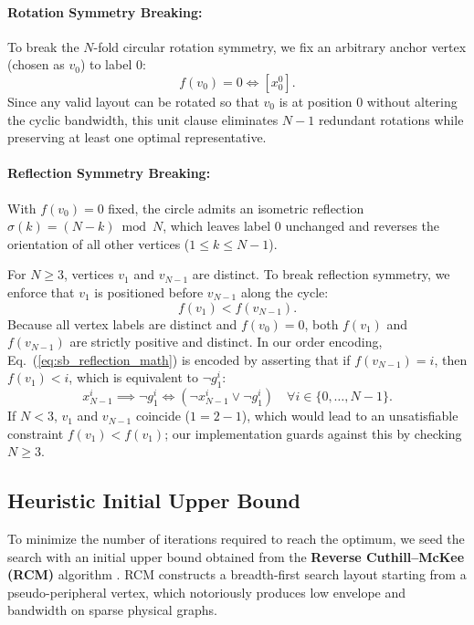 \documentclass[a4paper,fleqn]{cas-sc}
\begin{document}
\paragraph{Rotation Symmetry Breaking:}
To break the $N$-fold circular rotation symmetry, we fix an arbitrary anchor vertex (chosen as $v_0$) to label 0:
\begin{equation}
    f(v_0) = 0 \iff [x_0^0].
    \label{eq:sb_rotation}
\end{equation}
Since any valid layout can be rotated so that $v_0$ is at position 0 without altering the cyclic bandwidth, this unit clause eliminates $N - 1$ redundant rotations while preserving at least one optimal representative.

\paragraph{Reflection Symmetry Breaking:}
With $f(v_0) = 0$ fixed, the circle admits an isometric reflection $\sigma(k) = (N - k) \bmod N$, which leaves label 0 unchanged and reverses the orientation of all other vertices ($1 \le k \le N-1$).

For $N \ge 3$, vertices $v_1$ and $v_{N-1}$ are distinct. To break reflection symmetry, we enforce that $v_1$ is positioned before $v_{N-1}$ along the cycle:
\begin{equation}
    f(v_1) < f(v_{N-1}).
    \label{eq:sb_reflection_math}
\end{equation}
Because all vertex labels are distinct and $f(v_0) = 0$, both $f(v_1)$ and $f(v_{N-1})$ are strictly positive and distinct. In our order encoding, Eq.~(\ref{eq:sb_reflection_math}) is encoded by asserting that if $f(v_{N-1}) = i$, then $f(v_1) < i$, which is equivalent to $\neg g_1^i$:
\begin{equation}
    x_{N-1}^i \implies \neg g_1^i \iff (\neg x_{N-1}^i \lor \neg g_1^i) \quad \forall i \in \{0, \dots, N-1\}.
    \label{eq:sb_reflection_clauses}
\end{equation}
If $N < 3$, $v_1$ and $v_{N-1}$ coincide ($1 = 2 - 1$), which would lead to an unsatisfiable constraint $f(v_1) < f(v_1)$; our implementation guards against this by checking $N \ge 3$.

\subsection{Heuristic Initial Upper Bound}
To minimize the number of iterations required to reach the optimum, we seed the search with an initial upper bound obtained from the \textbf{Reverse Cuthill--McKee (RCM)} algorithm \citep{cuthill1969rcm}. RCM constructs a breadth-first search layout starting from a pseudo-peripheral vertex, which notoriously produces low envelope and bandwidth on sparse physical graphs.
\end{document}
